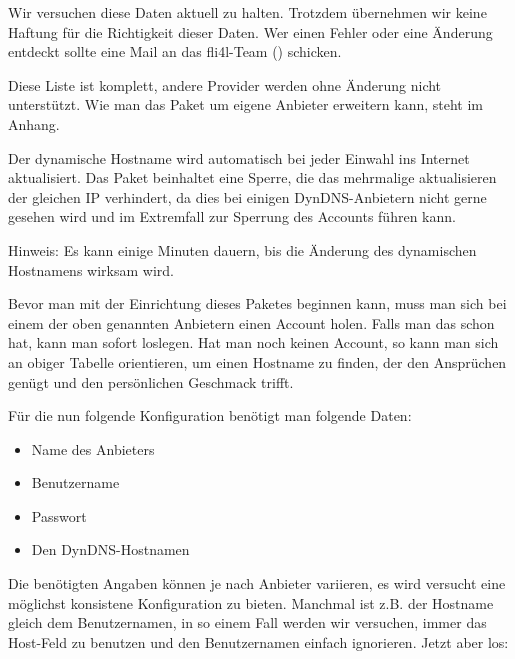 				  
	  

	Wir versuchen diese Daten aktuell zu halten. Trotzdem übernehmen wir
	keine Haftung für die Richtigkeit dieser Daten. Wer einen Fehler oder
	eine Änderung entdeckt sollte eine Mail an das fli4l-Team
	() schicken.

	Diese Liste ist komplett, andere Provider werden ohne Änderung nicht
	unterstützt. Wie man das Paket um eigene Anbieter erweitern kann, steht
	im Anhang.

	Der dynamische Hostname wird automatisch bei jeder Einwahl ins Internet
	aktualisiert. Das Paket beinhaltet eine Sperre, die das mehrmalige
	aktualisieren der gleichen IP verhindert, da dies bei einigen
	DynDNS-Anbietern nicht gerne gesehen wird und im Extremfall zur Sperrung
	des Accounts führen kann.

	Hinweis: Es kann einige Minuten dauern, bis die Änderung des dynamischen
	Hostnamens wirksam wird.

	Bevor man mit der Einrichtung dieses Paketes beginnen kann, muss man sich
	bei einem der oben genannten Anbietern einen Account holen. Falls man
	das schon hat, kann man sofort loslegen. Hat man noch keinen Account,
	so kann man sich an obiger Tabelle orientieren, um einen Hostname zu
	finden, der den Ansprüchen genügt und den persönlichen Geschmack trifft.

	Für die nun folgende Konfiguration benötigt man folgende Daten:

	\begin{itemize}
		\item Name des Anbieters
		\item Benutzername
		\item Passwort
		\item Den DynDNS-Hostnamen
	\end{itemize}

	Die benötigten Angaben können je nach Anbieter variieren, es wird versucht
	eine möglichst konsistene Konfiguration zu bieten. Manchmal ist z.B.
	der Hostname gleich dem Benutzernamen, in so einem Fall werden wir 
	versuchen, immer das Host-Feld zu benutzen und den Benutzernamen einfach
	ignorieren. Jetzt aber los:

